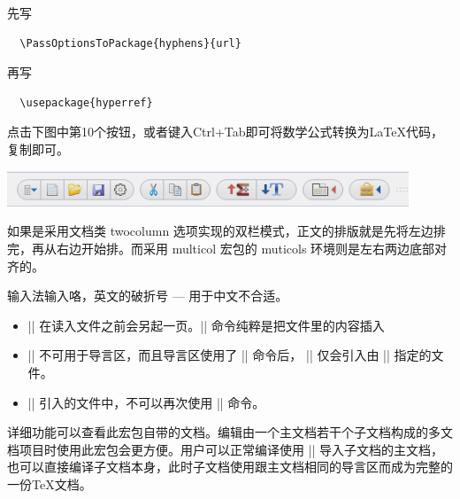 
先写
\begin{verbatim}
  \PassOptionsToPackage{hyphens}{url}
\end{verbatim}

再写
\begin{verbatim}
  \usepackage{hyperref}
\end{verbatim}



点击下图中第10个按钮，或者键入Ctrl+Tab即可将数学公式转换为\LaTeX{}代码，复制即可。

\includegraphics[width=0.9\textwidth]{include/images/amxmath_texstudio}



如果是采用文档类 twocolumn 选项实现的双栏模式，正文的排版就是先将左边排完，再从右边开始排。而采用
multicol 宏包的 muticols 环境则是左右两边底部对齐的。



输入法输入咯，英文的破折号 --- 用于中文不合适。



\begin{itemize}
  \item || 在读入文件之前会另起一页。|| 命令纯粹是把文件里的内容插入
  \item || 不可用于导言区，而且导言区使用了 || 命令后，
  || 仅会引入由 || 指定的文件。
  \item || 引入的文件中，不可以再次使用 || 命令。
\end{itemize}



详细功能可以查看此宏包自带的文档。编辑由一个主文档若干个子文档构成的多文档项目时使用此宏包会更方便。用户可以正常编译使用
|| 导入子文档的主文档，也可以直接编译子文档本身，此时子文档使用跟主文档相同的导言区而成为完整的一份\TeX{}文档。






